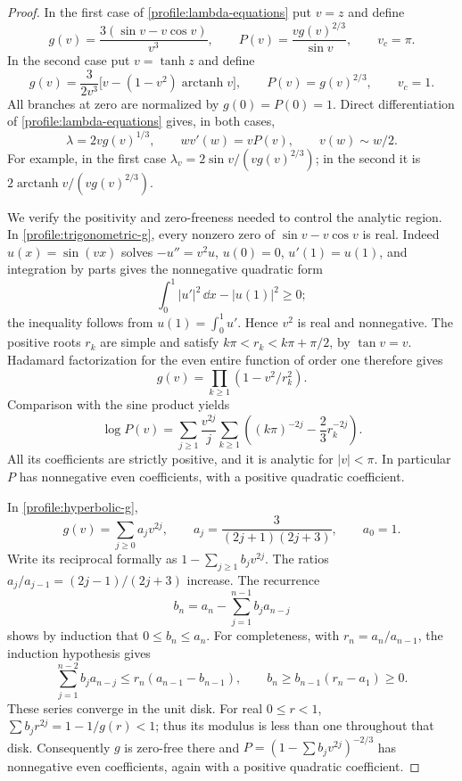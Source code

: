 \begin{proof}
In the first case of \eqref{profile:lambda-equations} put \(v=z\)
and define
\begin{equation}
 \label{profile:trigonometric-g}
 g(v)=\frac{3(\sin v-v\cos v)}{v^3},\qquad
 P(v)=\frac{v g(v)^{2/3}}{\sin v},\qquad v_c=\pi.
\end{equation}
In the second case put \(v=\tanh z\) and define
\begin{equation}
 \label{profile:hyperbolic-g}
 g(v)=\frac{3}{2v^3}
       \bigl[v-(1-v^2)\operatorname{arctanh}v\bigr],\qquad
 P(v)=g(v)^{2/3},\qquad v_c=1.
\end{equation}
All branches at zero are normalized by \(g(0)=P(0)=1\).
Direct differentiation of \eqref{profile:lambda-equations} gives,
in both cases,
\begin{equation}
 \label{profile:v-equation}
 \lambda=2v g(v)^{1/3},\qquad
 wv'(w)=vP(v),\qquad v(w)\sim w/2.
\end{equation}
For example, in the first case
\(\lambda_v=2\sin v/(vg(v)^{2/3})\); in the second it is
\(2\operatorname{arctanh}v/(vg(v)^{2/3})\).

We verify the positivity and zero-freeness needed to control the
analytic region. In \eqref{profile:trigonometric-g}, every nonzero
zero of \(\sin v-v\cos v\) is real. Indeed
\(u(x)=\sin(vx)\) solves
\(-u''=v^2u\), \(u(0)=0\), \(u'(1)=u(1)\), and integration by
parts gives the nonnegative quadratic form
\[
 \int_0^1|u'|^2\,\dd x-|u(1)|^2\ge0;
\]
the inequality follows from \(u(1)=\int_0^1u'\). Hence \(v^2\) is
real and nonnegative. The positive roots \(r_k\) are simple and
satisfy \(k\pi<r_k<k\pi+\pi/2\), by \(\tan v=v\).
Hadamard factorization for the even entire function of order one
\cite[Theorem~3.7, p.~43]{McMullen2017} therefore gives
\[
 g(v)=\prod_{k\ge1}(1-v^2/r_k^2).
\]
Comparison with the sine product yields
\[
 \log P(v)=\sum_{j\ge1}\frac{v^{2j}}{j}
 \sum_{k\ge1}\left((k\pi)^{-2j}-\frac23r_k^{-2j}\right).
\]
All its coefficients are strictly positive, and it is analytic for
\(|v|<\pi\). In particular \(P\) has nonnegative even
coefficients, with a positive quadratic coefficient.

In \eqref{profile:hyperbolic-g},
\[
 g(v)=\sum_{j\ge0}a_jv^{2j},\qquad
 a_j=\frac{3}{(2j+1)(2j+3)},\qquad a_0=1.
\]
Write its reciprocal formally as
\(1-\sum_{j\ge1}b_jv^{2j}\). The ratios
\(a_j/a_{j-1}=(2j-1)/(2j+3)\) increase. The recurrence
\[
 b_n=a_n-\sum_{j=1}^{n-1}b_ja_{n-j}
\]
shows by induction that \(0\le b_n\le a_n\). For completeness,
with \(r_n=a_n/a_{n-1}\), the induction hypothesis gives
\[
 \sum_{j=1}^{n-2}b_ja_{n-j}
 \le r_n(a_{n-1}-b_{n-1}),\qquad
 b_n\ge b_{n-1}(r_n-a_1)\ge0.
\]
These series converge in the unit disk. For real \(0\le r<1\),
\(\sum b_jr^{2j}=1-1/g(r)<1\); thus its modulus is less than one
throughout that disk. Consequently \(g\) is zero-free there and
\(P=(1-\sum b_jv^{2j})^{-2/3}\) has nonnegative even
coefficients, again with a positive quadratic coefficient.


\end{proof}
